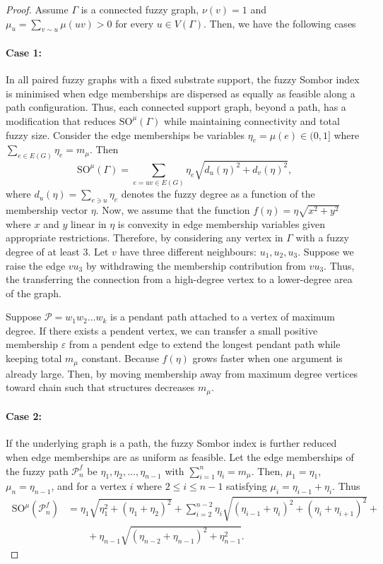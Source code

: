 \documentclass[12pt]{amsart}
\newcommand{\case}[1]{\paragraph*{Case #1:}}
\newcommand{\SOG}{\mathrm{SO}^{\mu}}
\newcommand{\PP}{\mathcal{P}}
\begin{document}
\begin{proof}
Assume $\Gamma$ is a connected fuzzy graph, $\nu(v)=1$ and $\mu_u = \sum_{v \sim u} \mu(uv) > 0$ for every $u \in V(\Gamma)$. Then, we have the following cases

\case{1} In all paired fuzzy graphs with a fixed substrate support, the fuzzy Sombor index is minimised when edge memberships are dispersed as equally as feasible along a path configuration. Thus,  each connected support graph, beyond a path, has a modification that reduces $\SOG(\Gamma)$ while maintaining connectivity and total fuzzy size. Consider the edge memberships be variables $\eta_e=\mu(e) \in (0,1]$ where $\sum_{e \in E(G)} \eta_e= m_{\mu}$. Then
\begin{equation}~\label{eqq1MainThmSom2}
\SOG(\Gamma) = \sum_{e=uv \in E(G)} \eta_e \sqrt{d_u(\eta)^2 + d_v(\eta)^2},
\end{equation}
where $d_u(\eta) = \sum_{e \ni u} \eta_e$ denotes the fuzzy degree as a function of the membership vector $\eta$. 
Now, we assume that the function $f(\eta) = \eta \sqrt{x^2+y^2}$ where $x$ and $y$ linear in $\eta$ is convexity in edge membership variables given appropriate restrictions.  Therefore,  by considering any vertex in $\Gamma$ with a fuzzy degree of at least $3$. Let $v$ have three different neighbours: $u_1, u_2, u_3$. Suppose we raise the edge $vu_3$ by withdrawing the membership contribution from $vu_3$. Thus, the transferring the connection from a high-degree vertex to a lower-degree area of the graph.
 
 Suppose $\PP = w_1w_2\dots w_k$ is a pendant path attached to a vertex of maximum degree. If there exists a pendent vertex, we can transfer a small positive membership $\varepsilon$ from a pendent edge to extend the longest pendant path while keeping total $m_{\mu}$ constant. Because $f(\eta)$ grows faster when one argument is already large. Then, by moving membership away from maximum degree vertices toward chain such that structures decreases $m_\mu$.

\case{2} If the underlying graph is a path, the fuzzy Sombor index is further reduced when edge memberships are as uniform as feasible. Let the edge memberships of the fuzzy path $\PP_n^f$ be $\eta_1, \eta_2, \dots, \eta_{n-1}$ with $\sum_{i=1}^{n} \eta_i=m_{\mu}$. Then,  $\mu_{1}=\eta_1$, $\mu_n=\eta_{n-1}$, and  for a vertex $i$ where $2 \leqslant i \leqslant n-1$ satisfying $\mu_i=\eta_{i-1}+\eta_i$. Thus
\begin{equation}~\label{eqq2MainThmSom2}
\begin{aligned}
\SOG(\PP_n^f)&=\eta_1\sqrt{\eta_1^2+(\eta_1+\eta_2)^2}+\sum_{i=2}^{n-2} \eta_i \sqrt{(\eta_{i-1}+\eta_i)^2+(\eta_i+\eta_{i+1})^2}+\\
& \qquad +\eta_{n-1}\sqrt{(\eta_{n-2}+\eta_{n-1})^2+\eta_{n-1}^2}.  
\end{aligned}
\end{equation}


\end{proof}
\end{document}
